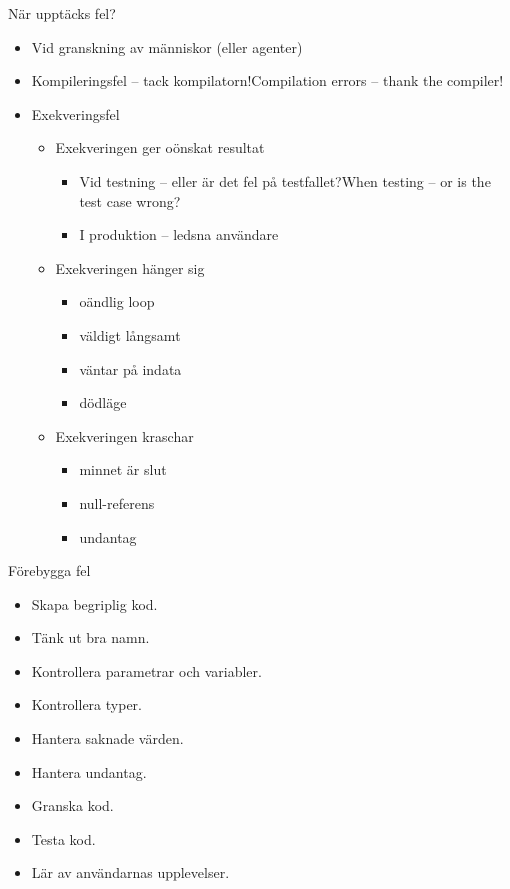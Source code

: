 \begin{Slide}{När upptäcks fel?}
\begin{itemize}
\item Vid granskning av människor (eller agenter)
\item \ifswedish Kompileringsfel -- tack kompilatorn!\else Compilation errors -- thank the compiler!\fi
\item Exekveringsfel \pause 
\begin{itemize}
\item Exekveringen ger oönskat resultat 
\begin{itemize}
\item \ifswedish Vid testning -- eller är det fel på testfallet?\else When testing -- or is the test case wrong?\fi
\item I produktion -- ledsna användare \code{:(}  
\end{itemize}
\item Exekveringen hänger sig 
\begin{itemize}
\item oändlig loop  
\item väldigt långsamt  
\item väntar på indata
\item dödläge
\end{itemize}
\item Exekveringen kraschar 
\begin{itemize}
\item minnet är slut
\item null-referens
\item undantag 
\end{itemize}
\end{itemize}
\end{itemize}
\end{Slide}

\begin{Slide}{Förebygga fel}
\begin{itemize}
\item Skapa begriplig kod.
\item Tänk ut bra namn.
\item Kontrollera parametrar och variabler.
\item Kontrollera typer.
\item Hantera saknade värden.
\item Hantera undantag.
\item Granska kod.
\item Testa kod.
\item Lär av användarnas upplevelser.
\end{itemize}
\end{Slide}

